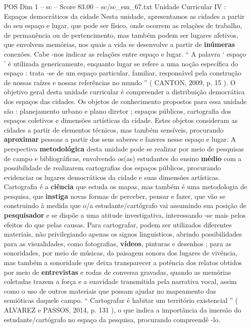 \begin{textsample}{POS Dim 1 – sc – Score 83.00 – sc/sc\_em\_67.txt}
Unidade Curricular IV : Espaços democráticos da cidade Nesta unidade, apresentamos as cidades a partir do seu espaço e lugar, que pode ser físico, onde ocorrem as relações de trabalho, de permanência ou de pertencimento, mas também podem ser lugares afetivos, que envolvem memórias, nos quais a vida se desenvolve a partir de \textbf{inúmeras} conexões.
Cabe -nos indicar as relações entre espaço e lugar. “ A palavra ‘ espaço ’ é utilizada genericamente, enquanto lugar se refere a uma noção específica do espaço : trata -se de um espaço particular, familiar, responsável pela construção de nossas raízes e nossas referências no mundo ” ( CANTON, 2009, p. 15 ).
O objetivo geral desta unidade curricular é compreender a distribuição democrática dos espaços das cidades.
Os objetos de conhecimento propostos para essa unidade são : planejamento urbano e plano diretor ; espaços públicos, cartografia dos espaços coletivos e dimensões artísticas da cidade.
Estes objetos consideram as cidades a partir de elementos técnicos, mas também sensíveis, procurando \textbf{aproximar} pessoas a partir dos seus saberes e fazeres nesse espaço e lugar.
A perspectiva \textbf{metodológica} desta unidade pode se realizar por meio de pesquisas de campo e bibliográficas, envolvendo os(as) estudantes do ensino \textbf{médio} com a possibilidade de realizarem cartografias dos espaços públicos, procurando evidenciar os lugares democráticos da cidade e suas dimensões artísticas.
Cartografia é a \textbf{ciência} que estuda os mapas, mas também é uma metodologia de pesquisa, que \textbf{instiga} novas formas de perceber, pensar e fazer, que vão se construindo à medida que o/a estudante/cartógrafo vai assumindo sua posição de \textbf{pesquisador} e se dispõe a uma atitude investigativa, interessando -se mais pelos efeitos do que pelas causas.
Para cartografar, podem ser utilizados diferentes materiais, não privilegiando apenas os signos linguísticos, abrindo possibilidades para as visualidades, como fotografias, \textbf{vídeos}, pinturas e desenhos ; para as sonoridades, por meio de músicas, da paisagem sonora dos lugares de vivência, mas também a sonoridade que deixa transparecer a potência dos relatos obtidos por meio de \textbf{entrevistas} e rodas de conversa gravadas, quando as memórias coletadas trazem a força e a suavidade transmitida pela narrativa vocal, assim como o uso de outros materiais que possam ajudar no mapeamento das semióticas daquele campo. “ Cartografar é habitar um território existencial ” ( ALVAREZ e PASSOS, 2014, p. 131 ), o que indica a importância da imersão do estudante/cartógrafo no espaço da pesquisa, procurando compreendê -lo.

\end{textsample}
